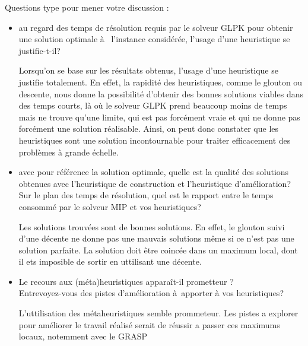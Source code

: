 %
%

\vspace{5mm}
\noindent
{}
\vspace{2mm}

\noindent
Questions type pour mener votre discussion :

\begin{itemize}
\item au regard des temps de résolution requis par le solveur GLPK pour obtenir une solution optimale à  l'instance considérée, l'usage d'une heuristique se justifie-t-il?

\noindent
Lorsqu'on se base sur les résultats obtenus, l'usage d'une heuristique se justifie totalement. En effet, la rapidité des heuristiques, comme le glouton ou descente, nous donne la possibilité d'obtenir des bonnes solutions viables dans des temps courts, là où le solveur GLPK prend beaucoup moins de temps mais ne trouve qu'une limite, qui est pas forcément vraie et qui ne donne pas forcément une solution réalisable. Ainsi, on peut donc constater que les heuristiques sont une solution incontournable pour traiter efficacement des problèmes à grande échelle.

\vspace{3mm}
\noindent
\item avec pour référence la solution optimale, quelle est la qualité des solutions obtenues avec l'heuristique de construction et l'heuristique d'amélioration? \\
Sur le plan des temps de résolution, quel est le rapport  entre le temps consommé par le solveur MIP et vos heuristiques?

\noindent
Les solutions trouvées sont de bonnes solutions. En effet, le glouton suivi d'une décente ne donne pas une mauvais solutions même si ce n'est pas une solution parfaite. La solution doit être coincée dans un maximum local, dont il ets imposible de sortir en uttilisant une décente.

\vspace{3mm}
\noindent
\item Le recours aux (méta)heuristiques apparaît-il prometteur ? \\
Entrevoyez-vous des pistes d'amélioration à apporter à vos heuristiques?

\noindent
L'uttilisation des métaheuristiques semble prommeteur. Les pistes a explorer pour améliorer le travail réalisé serait de réussir a passer ces maximums locaux, notemment avec le GRASP

\vfill
\break

\end{itemize}
